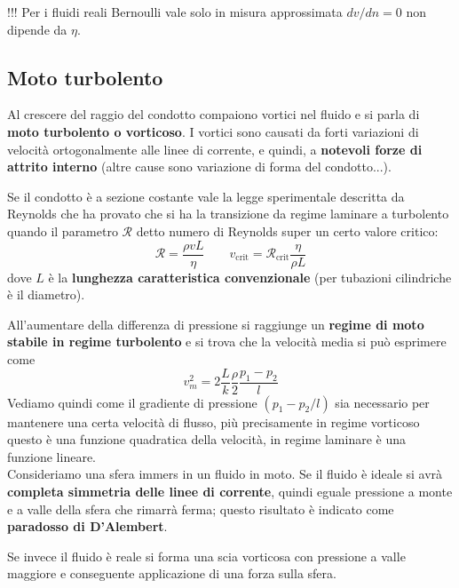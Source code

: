 \documentclass[x11names]{report}
\begin{document}
		\begin{center}
			\colorbox{attenzione}{\begin{minipage}{5.75in}
					\begin{attenzione}{!!!}
						Per i fluidi reali Bernoulli vale solo in misura approssimata  \(dv/dn = 0\) non dipende da \(\eta\).
					\end{attenzione}
			\end{minipage}}
		\end{center}
		
		\subsection{Moto turbolento}
		Al crescere del raggio del condotto compaiono vortici nel fluido e si parla di \textbf{moto turbolento o vorticoso}. I vortici sono causati da forti variazioni di velocità ortogonalmente alle linee di corrente, e quindi, a \textbf{notevoli forze di attrito interno} (altre cause sono variazione di forma del condotto...).
		
		Se il condotto è a sezione costante vale la legge sperimentale descritta da Reynolds che ha provato che si ha la transizione da regime laminare a turbolento quando il parametro \(\mathcal{R}\) detto numero di Reynolds super un certo valore critico:
		\[ 
		\mathcal{R} = \frac{\rho v L}{\eta} \qquad  v_{\text{crit}} = \mathcal{R}_{\text{crit}}\frac{\eta}{\rho L}
		\]
		dove \(L\) è la \textbf{lunghezza caratteristica convenzionale} (per tubazioni cilindriche è il diametro).
		
		All'aumentare della differenza di pressione si raggiunge un \textbf{regime di moto stabile in regime turbolento} e si trova che la velocità media si può esprimere come
		\[ 
		v_{m}^2 = 2\frac{L}{k}\frac{\rho }{2} \frac{p_{1} - p_{2}}{l} 
		\]
		Vediamo quindi come il gradiente di pressione \((p_{1}-p_{2}/l)\) sia necessario per mantenere una certa velocità di flusso, più precisamente in regime vorticoso questo è una funzione quadratica della velocità, in regime laminare è una funzione lineare. \\
		
		\noindent
		Consideriamo una sfera immers in un fluido in moto. Se il fluido è ideale si avrà \textbf{completa simmetria delle linee di corrente}, quindi eguale pressione a monte e a valle della sfera che rimarrà ferma; questo risultato è indicato come \textbf{paradosso di D'Alembert}. 
		
		Se invece il fluido è reale si forma una scia vorticosa con pressione a valle maggiore e conseguente applicazione di una forza sulla sfera.
		
\end{document}
